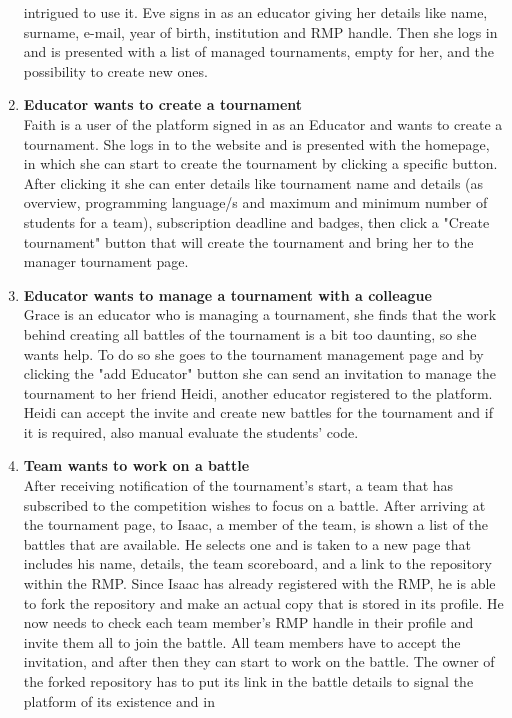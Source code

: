 \begin{enumerate}[label=$\bullet$ \textbf{SC\arabic*:}]
    intrigued to use it. Eve signs in as an educator giving her details like name, surname, e-mail, year of birth, institution and RMP handle. Then she logs in and is presented with a list of managed tournaments, empty for her, 
    and the possibility to create new ones.
    \item \textbf{Educator wants to create a tournament}\\ Faith is a user of the platform signed in as an Educator and wants to create a tournament. She logs in to the website and is presented with the homepage, in which she can 
    start to create the tournament by clicking a specific button. After clicking it she can enter details like tournament name and details (as overview, programming language/s and maximum and minimum number of students for a team), 
    subscription deadline and badges, then click a "Create tournament" button that will create the tournament and bring her to the manager tournament page. 
    \item \textbf{Educator wants to manage a tournament with a colleague}\\ Grace is an educator who is managing a tournament, she finds that the work behind creating all battles of the tournament is a bit too daunting, so she wants 
    help. To do so she goes to the tournament management page and by clicking the "add Educator" button she can send an invitation to manage the tournament to her friend Heidi, another educator registered to the platform. Heidi 
    can accept the invite and create new battles for the tournament and if it is required, also manual evaluate the students' code.
    \item \textbf{Team wants to work on a battle}\\ After receiving notification of the tournament's start, a team that has subscribed to the competition wishes to focus on a battle. After arriving at the tournament page, to Isaac, 
    a member of the team, is shown a list of the battles that are available. He selects one and is taken to a new page that includes his name, details, the team scoreboard, and a link to the repository within the RMP. Since Isaac 
    has already registered with the RMP, he is able to fork the repository and make an actual copy that is stored in its profile. He now needs to check each team member's RMP handle in their profile and invite them all to join the 
    battle. All team members have to accept the invitation, and after then they can start to work on the battle. The owner of the forked repository has to put its link in the battle details to signal the platform of its existence and in

\end{enumerate}
